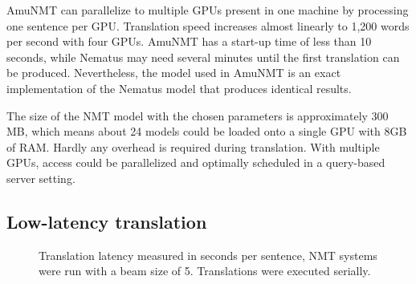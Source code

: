 \documentclass[11pt]{article}
\begin{document}
AmuNMT can parallelize to multiple GPUs present in one machine by processing one sentence per GPU. Translation speed increases almost linearly to 1,200 words per second with four GPUs. 
AmuNMT has a start-up time of less than 10 seconds, while Nematus may need several minutes until the first translation can be produced. Nevertheless, the model used in AmuNMT is an exact implementation of the Nematus model that produces identical results.

The size of the NMT model with the chosen parameters is approximately 300 MB, which means about 24 models could be loaded onto a single GPU with 8GB of RAM. Hardly any overhead is required during translation. With multiple GPUs, access could be parallelized and optimally scheduled in a query-based server setting. 

\subsection{Low-latency translation}

\begin{figure}[t]
\centering
{}
\caption{Translation latency measured in seconds per sentence, NMT systems were run with a beam size of 5. Translations were executed serially.}\label{latency}
\end{figure}
\end{document}
